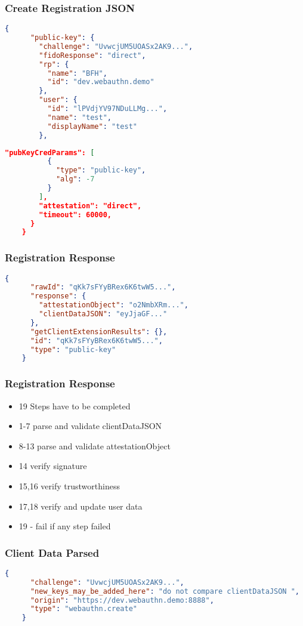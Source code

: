 \documentclass{beamer}
\begin{document}
\begin{frame}
  \frametitle{Create Registration JSON}
  \begin{lstlisting}[language=json]
    {
      "public-key": {
        "challenge": "UvwcjUM5UOASx2AK9...",
        "fidoResponse": "direct",
        "rp": {
          "name": "BFH",
          "id": "dev.webauthn.demo"
        },
        "user": {
          "id": "lPVdjYV97NDuLLMg...",
          "name": "test",
          "displayName": "test"
        },
  \end{lstlisting}
  \framebreak

  \begin{lstlisting}[language=json]
        "pubKeyCredParams": [
          {
            "type": "public-key",
            "alg": -7
          }
        ],
        "attestation": "direct",
        "timeout": 60000,
      }
    }
  \end{lstlisting}
\end{frame}

\begin{frame}[fragile]
  \frametitle{Registration Response}
  \begin{lstlisting}[language=json]
    {
      "rawId": "qKk7sFYyBRex6K6twW5...",
      "response": {
        "attestationObject": "o2NmbXRm...",
        "clientDataJSON": "eyJjaGF..."
      },
      "getClientExtensionResults": {},
      "id": "qKk7sFYyBRex6K6twW5...",
      "type": "public-key"
    }
  \end{lstlisting}
\end{frame}

\begin{frame}[fragile]
  \frametitle{Registration Response}
  \begin{itemize}
    \item 19 Steps have to be completed
    \item 1-7 parse and validate clientDataJSON
    \item 8-13 parse and validate attestationObject
    \item 14 verify signature
    \item 15,16 verify trustworthiness 
    \item 17,18 verify and update user data
    \item 19 - fail if any step failed
  \end{itemize}
\end{frame}

\begin{frame}[fragile]
  \frametitle{Client Data Parsed}
  \begin{lstlisting}[language=json]
    {
      "challenge": "UvwcjUM5UOASx2AK9...",
      "new_keys_may_be_added_here": "do not compare clientDataJSON ",
      "origin": "https://dev.webauthn.demo:8888",
      "type": "webauthn.create"
    }
  \end{lstlisting}
\end{frame}
\end{document}
